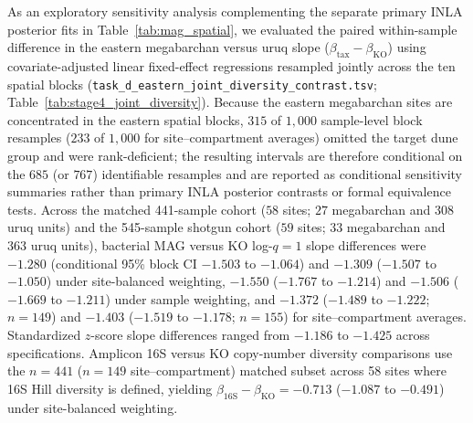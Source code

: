 As an exploratory sensitivity analysis complementing the separate primary INLA posterior fits in Table~\ref{tab:mag_spatial}, we evaluated the paired within-sample difference in the eastern megabarchan versus uruq slope ($\beta_{\mathrm{tax}} - \beta_{\mathrm{KO}}$) using covariate-adjusted linear fixed-effect regressions resampled jointly across the ten spatial blocks (\texttt{task\_\allowbreak d\_\allowbreak eastern\_\allowbreak joint\_\allowbreak diversity\_\allowbreak contrast.tsv}; Table~\ref{tab:stage4_joint_diversity}). Because the eastern megabarchan sites are concentrated in the eastern spatial blocks, $315$ of $1{,}000$ sample-level block resamples ($233$ of $1{,}000$ for site--compartment averages) omitted the target dune group and were rank-deficient; the resulting intervals are therefore conditional on the $685$ (or $767$) identifiable resamples and are reported as conditional sensitivity summaries rather than primary INLA posterior contrasts or formal equivalence tests. Across the matched 441-sample cohort ($58$ sites; $27$ megabarchan and $308$ uruq units) and the 545-sample shotgun cohort ($59$ sites; $33$ megabarchan and $363$ uruq units), bacterial MAG versus KO log-$q=1$ slope differences were $-1.280$ (conditional 95\% block CI $-1.503$ to $-1.064$) and $-1.309$ ($-1.507$ to $-1.050$) under site-balanced weighting, $-1.550$ ($-1.767$ to $-1.214$) and $-1.506$ ($-1.669$ to $-1.211$) under sample weighting, and $-1.372$ ($-1.489$ to $-1.222$; $n=149$) and $-1.403$ ($-1.519$ to $-1.178$; $n=155$) for site--compartment averages. Standardized $z$-score slope differences ranged from $-1.186$ to $-1.425$ across specifications. Amplicon 16S versus KO copy-number diversity comparisons use the $n=441$ ($n=149$ site--compartment) matched subset across 58 sites where 16S Hill diversity is defined, yielding $\beta_{\mathrm{16S}} - \beta_{\mathrm{KO}} = -0.713$ ($-1.087$ to $-0.491$) under site-balanced weighting.

